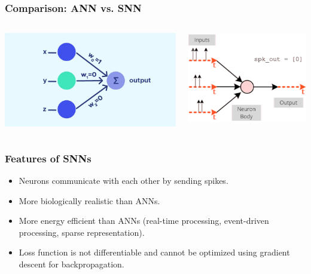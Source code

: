 \documentclass[aspectratio=169, 11pt]{beamer}
\begin{document}
\begin{frame}
  \frametitle{Comparison: ANN vs. SNN}
  \begin{columns}
    \begin{column}{0.5\textwidth}
      \includegraphics[width=\textwidth]{image/perceptrons.png}
    \end{column}
    \begin{column}{0.5\textwidth}
      \includegraphics[width=\textwidth]{image/def1.png}
    \end{column}
  \end{columns}
\end{frame}

\begin{frame}
  \frametitle{Features of SNNs}
  \begin{itemize}
    \item Neurons communicate with each other by sending spikes.
    \item More biologically realistic than ANNs.
    \item More energy efficient than ANNs (real-time processing, event-driven processing, sparse representation).
    \item Loss function is not differentiable and cannot be optimized using gradient descent for backpropagation.
  \end{itemize}
\end{frame}
\end{document}
